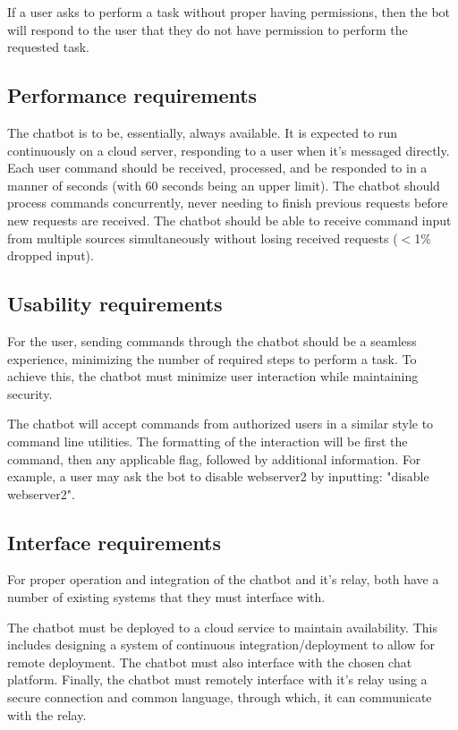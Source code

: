 \documentclass[onecolumn, draftclsnofoot,10pt, compsoc]{IEEEtran}
\begin{document}
If a user asks to perform a task without proper having permissions, then the bot will respond to the user that they do not have permission to perform the requested task.

\subsection{Performance requirements}
The chatbot is to be, essentially, always available.
It is expected to run continuously on a cloud server, responding to a user when it's messaged directly.
Each user command should be received, processed, and be responded to in a manner of seconds (with 60 seconds being an upper limit).
The chatbot should process commands concurrently, never needing to finish previous requests before new requests are received.
The chatbot should be able to receive command input from multiple sources simultaneously without losing received requests ($<$1\% dropped input). 

\subsection{Usability requirements}
For the user, sending commands through the chatbot should be a seamless experience, minimizing the number of required steps to perform a task.
To achieve this, the chatbot must minimize user interaction while maintaining security.

The chatbot will accept commands from authorized users in a similar style to command line utilities.
The formatting of the interaction will be first the command, then any applicable flag, followed by additional information.
For example, a user may ask the bot to disable webserver2 by inputting: "disable webserver2".

\subsection{Interface requirements}
For proper operation and integration of the chatbot and it's relay, both have a number of existing systems that they must interface with.

The chatbot must be deployed to a cloud service to maintain availability. 
This includes designing a system of continuous integration/deployment to allow for remote deployment.
The chatbot must also interface with the chosen chat platform.
Finally, the chatbot must remotely interface with it's relay using a secure connection and common language, through which, it can communicate with the relay.
\end{document}
